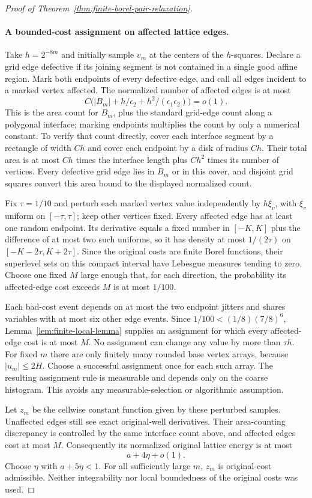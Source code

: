 \documentclass[11pt]{article}
\numberwithin{equation}{section}
\begin{document}
\begin{proof}[Proof of Theorem~\ref{thm:finite-borel-pair-relaxation}]
\paragraph{A bounded-cost assignment on affected lattice edges.}
Take $h=2^{-8m}$ and initially sample $v_m$ at the centers of the
$h$-squares. Declare a grid edge defective if its joining segment
is not contained in a single good affine region. Mark both endpoints
of every defective edge, and call all edges incident to a marked
vertex affected. The normalized number of affected edges is at most
\[
 C\bigl(|B_m|+h/\epsilon_2+h^2/(\epsilon_1\epsilon_2)\bigr)=o(1).
\]
This is the area count for $B_m$, plus the standard grid-edge
count along a polygonal interface; marking endpoints multiplies
the count by only a numerical constant.
To verify that count directly, cover each interface segment by a
rectangle of width $Ch$ and cover each endpoint by a disk of radius
$Ch$. Their total area is at most $Ch$ times the interface length
plus $Ch^2$ times its number of vertices. Every defective grid edge
lies in $B_m$ or in this cover, and disjoint grid squares convert
this area bound to the displayed normalized count.

Fix $\tau=1/10$ and perturb each marked vertex value independently
by $h\xi_v$, with $\xi_v$ uniform on $[-\tau,\tau]$; keep other
vertices fixed. Every affected edge has at least one random endpoint.
Its derivative equals a fixed number in $[-K,K]$ plus the difference
of at most two such uniforms, so it has density at most $1/(2\tau)$
on $[-K-2\tau,K+2\tau]$. Since the original costs are finite Borel
functions, their superlevel sets on this compact interval have
Lebesgue measures tending to zero. Choose one fixed $M$ large enough
that, for each direction, the probability its affected-edge cost
exceeds $M$ is at most $1/100$.

Each bad-cost event depends on at most the two endpoint jitters and
shares variables with at most six other edge events. Since
$1/100<(1/8)(7/8)^6$, Lemma~\ref{lem:finite-local-lemma} supplies
an assignment for which every affected-edge cost is at most $M$.
No assignment can change any value by more than $\tau h$.
For fixed $m$ there are only finitely many rounded base vertex arrays,
because $|u_m|\le2H$. Choose a successful assignment once for each
such array. The resulting assignment rule is measurable and depends
only on the coarse histogram. This avoids any measurable-selection
or algorithmic assumption.

Let $z_m$ be the cellwise constant function given by these perturbed
samples. Unaffected edges still see exact original-well derivatives.
Their area-counting discrepancy is controlled by the same interface
count above, and affected edges cost at most $M$. Consequently its
normalized original lattice energy is at most
\[
 a+4\eta+o(1).
\]
Choose $\eta$ with $a+5\eta<1$. For all sufficiently large $m$,
$z_m$ is original-cost admissible. Neither integrability nor local
boundedness of the original costs was used.


\end{proof}
\end{document}
